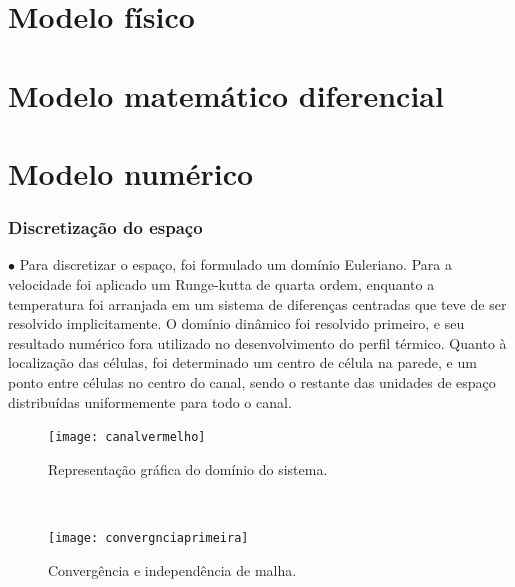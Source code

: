 \documentclass[xcolor=dvipsnames,10pt,aspectratio=169]{beamer}
\begin{document}
	\section{Modelo físico}
	
	
	
	

	
	\section{Modelo matemático diferencial}
	

	
	

	
	
	\section{Modelo numérico}
		
	
	
	
		
		\begin{frame}
			\frametitle{Discretização do espaço}
			\begin{minipage}[h!]{0.5\textwidth}
			$\bullet$ Para discretizar o espaço, foi formulado um domínio Euleriano. Para a velocidade foi aplicado um Runge-kutta de quarta ordem, enquanto a temperatura foi arranjada em um sistema de diferenças centradas que teve de ser resolvido implicitamente. O domínio dinâmico foi resolvido primeiro, e seu resultado numérico fora utilizado no desenvolvimento do perfil térmico. Quanto à localização das células, foi determinado um centro de célula na parede, e um ponto entre células no centro do canal, sendo o restante das unidades de espaço distribuídas uniformemente para todo o canal.
			\end{minipage}\hfill
			\begin{minipage}[h!]{0.45\textwidth}
			\begin{figure}
				\centering
				\texttt{[image: canalvermelho]}
				\caption{Representação gráfica do domínio do sistema.}
				\label{sistema}
			\end{figure}
			\end{minipage}\\
		\end{frame}
	
	
	
	
	
			\begin{frame}
		\begin{figure}
			\centering
			\texttt{[image: convergnciaprimeira]}
			\caption{Convergência e independência de malha.}
			\label{convergencia}
		\end{figure}
	\end{frame}
		
\end{document}
